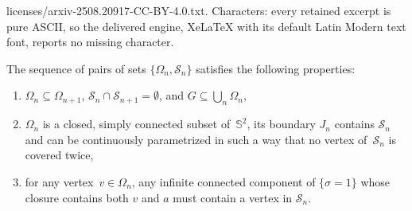 \documentclass[10pt,a4paper]{amsart}
\newcommand\bbS{\mathbb S}
\newcommand\calS{\mathcal S}
\newcommand\domain\Omega
\begin{document}
licenses/arxiv-2508.20917-CC-BY-4.0.txt. Characters: every retained excerpt is pure ASCII, so the delivered engine, XeLaTeX with its default Latin Modern text font, reports no missing character.
\begin{lemma}\label{lem:jordan-domains}
	The sequence of pairs of sets $\{\domain_n, \calS_n\}$ satisfies the following properties:
	\begin{enumerate}
	\item $\domain_n \subseteq \domain_{n+1}$, $\calS_n\cap \calS_{n+1} = \emptyset$, and $G \subseteq \bigcup_{n} \domain_n$,
 	\item $\domain_n$ is a closed, simply connected subset of~$\bbS^2$,  its boundary $J_n$ contains $\calS_n$ and can be continuously parametrized in such a way that no vertex of~$\calS_n$ is covered twice,
	\item for any vertex~$v \in \Omega_n$, any infinite connected component of $\{\sigma=1\}$ whose closure contains both $v$ and $a$ must contain a vertex in $\calS_n$.
\end{enumerate}
\end{lemma}  
\end{document}
